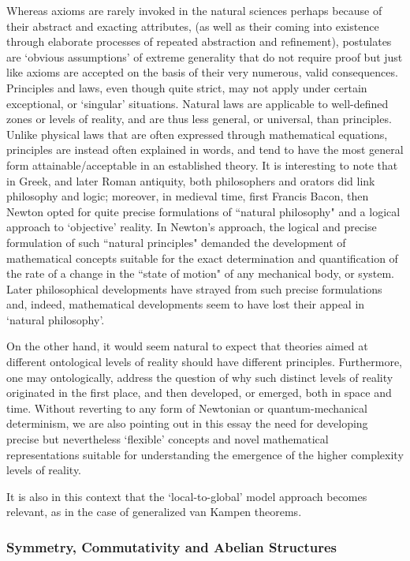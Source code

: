 \documentclass[12pt]{article}
\theoremstyle{plain}
\theoremstyle{definition}
\theoremstyle{plain}
\numberwithin{equation}{section}
\begin{document}
 Whereas axioms are rarely invoked in the natural
sciences perhaps because of their abstract and exacting
attributes, (as well as their coming into existence through
elaborate processes of repeated abstraction and refinement),
postulates are `obvious assumptions' of extreme generality that do
not require proof but just like axioms are accepted on the basis
of their very numerous, valid consequences. Principles and laws, even though quite strict, may not apply under certain exceptional, or `singular' situations. Natural laws are applicable to well-defined zones or levels of reality, and are thus less general, or universal, than principles. Unlike physical laws that are often expressed through
mathematical equations, principles are instead often explained in words,
and tend to have the most general form attainable/acceptable in an
established theory. It is interesting to note that in Greek, and later
Roman antiquity, both philosophers and orators did link philosophy and logic; moreover,
in medieval time, first Francis Bacon, then Newton opted for quite precise formulations
of ``natural philosophy" and a logical approach to `objective' reality. In Newton's
approach, the logical and precise formulation of such ``natural principles" demanded the
development of mathematical concepts suitable for the exact determination and quantification
of the rate of a change in the ``state of motion" of any mechanical body, or system.
Later philosophical developments have strayed from such precise formulations and, indeed, 
mathematical developments seem to have lost their appeal in `natural philosophy'. 

 On the other hand, it would seem natural to expect that theories aimed at different ontological levels of reality should have different principles. Furthermore, one may ontologically, address the question of why such distinct levels of reality originated in the first place, and then developed, or emerged, both in space and time.  Without reverting to any form of Newtonian or quantum-mechanical determinism, we are also pointing out in this essay the need for developing precise but nevertheless `flexible' concepts and novel mathematical representations suitable for understanding the emergence of the higher complexity levels of reality.  

 It is also in this context that the `local-to-global' model approach becomes relevant, as in the case of generalized van Kampen theorems.

\subsubsection{Symmetry, Commutativity and Abelian Structures}
\end{document}

